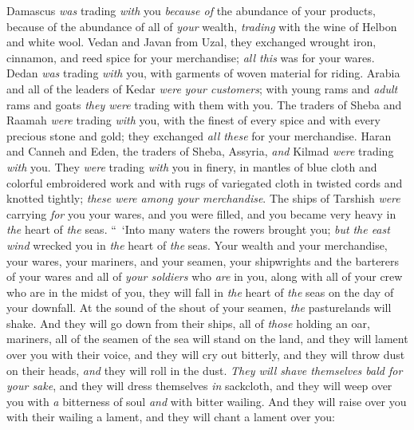 \begin{biblechapter}
\verse Damascus \textit{was} trading \textit{with} you \textit{because of} the abundance of your products, because of the abundance of all of \textit{your} wealth, \textit{trading} with the wine of Helbon and white wool.
\verse Vedan and Javan from Uzal, they exchanged wrought iron, cinnamon, and reed spice for your merchandise; \textit{all this} was for your wares.
\verse Dedan \textit{was} trading \textit{with} you, with garments of woven material for riding.
\verse Arabia and all of the leaders of Kedar \textit{were} \textit{your customers}; with young rams and \textit{adult} rams and goats \textit{they were} trading with them with you.
\verse The traders of Sheba and Raamah \textit{were} trading \textit{with} you, with the finest of every spice and with every precious stone and gold; they exchanged \textit{all these} for your merchandise.
\verse Haran and Canneh and Eden, the traders of Sheba, Assyria, \textit{and} Kilmad \textit{were} trading \textit{with} you.
\verse They \textit{were} trading \textit{with} you in finery, in mantles of blue cloth and colorful embroidered work and with rugs of variegated cloth in twisted cords and knotted tightly; \textit{these were among your merchandise}.
\verse The ships of Tarshish \textit{were} carrying \textit{for} you your wares, and you were filled, and you became very heavy in \textit{the} heart of \textit{the} seas.
\verse “ ‘Into many waters 
the rowers brought you; 
\textit{but} \textit{the east wind} wrecked you 
in \textit{the} heart of \textit{the} seas.
\verse Your wealth and your merchandise, your wares, 
your mariners, and your seamen, 
your shipwrights and the barterers of your wares 
and all of \textit{your soldiers} who \textit{are} in you, 
along with all of your crew who are in the midst of you, 
they will fall in \textit{the} heart of \textit{the} seas on the day of your downfall.
\verse At the sound of the shout of your seamen, 
\textit{the} pasturelands will shake.
\verse And they will go down from their ships, 
all of \textit{those} holding an oar, 
mariners, all of the seamen of the sea 
will stand on the land,
\verse and they will lament over you with their voice, 
and they will cry out bitterly, 
and they will throw dust on their heads, 
\textit{and} they will roll in the dust.
\verse \textit{They will shave themselves bald for your sake}, 
and they will dress themselves \textit{in} sackcloth, 
and they will weep over you with \textit{a} bitterness of soul 
\textit{and} with bitter wailing.
\verse And they will raise over you with their wailing a lament, 
and they will chant a lament over you: 

\end{biblechapter}
